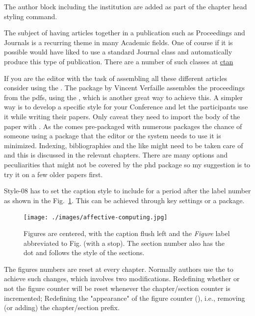The author block including the institution are added as part of the chapter head styling command.

\example The subject of having articles together in a publication such as Proceedings and Journals is a recurring theme in many Academic fields. One of course if it is possible would have liked to use a standard Journal class and automatically produce this type of publication. There are a number of such classes at \href{http://ctan.org/tex-archive/macros/latex/required/amslatex/amscls/doc/instr-l.pdf}{ctan}

\solution If you are the editor with the task of assembling all these different articles consider using the . The package by Vincent Verfaille assembles the proceedings from the pdfs, using the 
, which is another great way to achieve this. A simpler way is to develop a specific style for
your Conference and let the participants use it while writing their papers. Only caveat they need to import the
body of the paper with \string{}. As the  comes pre-packaged with
numerous packages the chance of someone using a package that the editor or the system needs to use it
is minimized. Indexing, bibliographies and the like might need to be taken care of and this is discussed in the relevant chapters. There are many options and peculiarities that might not be covered by the phd package so my suggestion is to try it on a few older papers first.

\example  Style-08 has to set the caption style to include for a period after the label number as shown in the Fig.~\ref{fig:eight02}. This can be achieved through key settings or a package.
\begin{figure}[ht]
\centering
\texttt{[image: ./images/affective-computing.jpg]}
\caption{Figures are centered, with the caption flush left and the \textit{Figure} label abbreviated to Fig. (with a stop). The section number also has the dot and follows the style of the sections.}
\label{fig:eight02}
\end{figure}

The figures numbers are reset at every chapter. Normally authors use the  to achieve such changes, which involves two modifications. Redefining whether or not the figure counter will be reset whenever the chapter/section counter is incremented; Redefining the "appearance" of the figure counter (\string\thefigure), i.e., removing (or adding) the chapter/section prefix.


